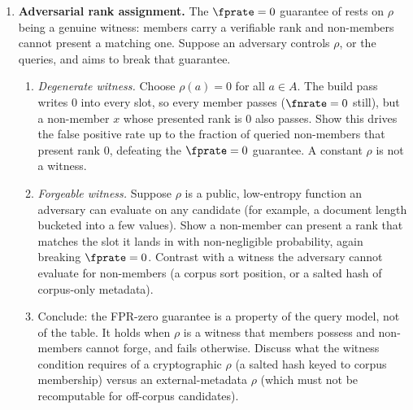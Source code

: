 \begin{enumerate}
\item \exstarstarstar
\label{ex:ch15-10}
\textbf{Adversarial rank assignment.}
The $\fprate = 0$ guarantee of  rests on $\rho$ being
a genuine witness: members carry a verifiable rank and non-members
cannot present a matching one. Suppose an adversary controls $\rho$,
or the queries, and aims to break that guarantee.
\begin{enumerate}
  \item[(a)] \emph{Degenerate witness.} Choose $\rho(a) = 0$ for all
    $a \in A$. The build pass writes $0$ into every slot, so every
    member passes ($\fnrate = 0$ still), but a non-member $x$ whose
    presented rank is $0$ also passes. Show this drives the false
    positive rate up to the fraction of queried non-members that
    present rank $0$, defeating the $\fprate = 0$ guarantee. A
    constant $\rho$ is not a witness.
  \item[(b)] \emph{Forgeable witness.} Suppose $\rho$ is a public,
    low-entropy function an adversary can evaluate on any candidate
    (for example, a document length bucketed into a few values).
    Show a non-member can present a rank that matches the slot it
    lands in with non-negligible probability, again breaking
    $\fprate = 0$. Contrast with a witness the adversary cannot
    evaluate for non-members (a corpus sort position, or a salted
    hash of corpus-only metadata).
  \item[(c)] Conclude: the FPR-zero guarantee is a property of the
    query model, not of the table. It holds when $\rho$ is a witness
    that members possess and non-members cannot forge, and fails
    otherwise. Discuss what the witness condition requires of a
    cryptographic $\rho$ (a salted hash keyed to corpus membership)
    versus an external-metadata $\rho$ (which must not be
    recomputable for off-corpus candidates).
\end{enumerate}


\end{enumerate}
